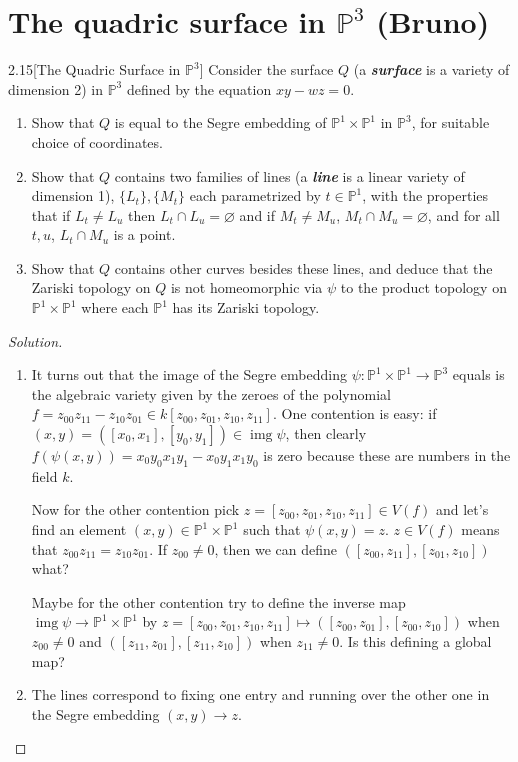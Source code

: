 \section{The quadric surface in $\mathbb{P}^3$ (Bruno)}

\begin{manualexercise}{2.15}[The Quadric Surface in $\mathbb{P}^3$]
	Consider the surface $Q$ (a \textbf{\textit{surface}} is a variety of dimension 2) in $\mathbb{P}^3$ defined by the equation $xy-wz=0$.
	\begin{enumerate}
		\item Show that $Q$ is equal to the Segre embedding of $\mathbb{P}^1\times\mathbb{P}^1$ in $\mathbb{P}^3$, for suitable choice of coordinates.
		\item Show that $Q$ contains two families of lines (a \textbf{\textit{line}} is a linear variety of dimension 1), $\{L_t\},\{M_t\}$ each parametrized by $t\in\mathbb{P}^1$, with the properties that if $L_t\neq L_u$ then $L_t\cap L_u=\varnothing$ and if $M_t\neq M_u$, $M_t\cap M_u=\varnothing$, and for all $t,u$, $L_t\cap M_u$ is a point.
		\item Show that $Q$ contains other curves besides these lines, and deduce that the Zariski topology on $Q$ is not homeomorphic via $\psi$ to the product topology on $\mathbb{P}^1\times \mathbb{P}^1$ where each $\mathbb{P}^1$ has its Zariski topology.
	\end{enumerate}
\end{manualexercise}

\begin{proof}[Solution]\leavevmode
	\begin{enumerate}
		\item It turns out that the image of the Segre embedding $\psi:\mathbb{P}^1\times\mathbb{P}^1\to\mathbb{P}^3$ equals is the algebraic variety given by the zeroes of the polynomial $f=z_{00}z_{11}-z_{10}z_{01}\in k[z_{00},z_{01},z_{10},z_{11}]$. One contention is easy: if $(x,y)=([x_0,x_1],[y_0,y_1])\in\operatorname{img}\psi$, then clearly $f(\psi(x,y))=x_0y_0x_1y_1-x_0y_1x_1y_0$ is zero because these are numbers in the field $k$.
		
		Now for the other contention pick $z=[z_{00},z_{01},z_{10},z_{11}]\in V(f)$ and let's find an element $(x,y)\in\mathbb{P}^1\times\mathbb{P}^1$ such that $\psi(x,y)=z$. $z\in V(f)$ means that $z_{00}z_{11}=z_{10}z_{01}$. If $z_{00}\neq0$, then we can define $([z_{00},z_{11}],[z_{01},z_{10}])$ {\color{magenta}what?}
		
		Maybe for the other contention try to define the inverse map $\operatorname{img}\psi\to\mathbb{P}^1\times\mathbb{P}^1$ by $z=[z_{00},z_{01},z_{10},z_{11}]\mapsto([z_{00},z_{01}],[z_{00},z_{10}])$ when $z_{00}\neq0$ and $([z_{11},z_{01}],[z_{11},z_{10}])$ when $z_{11}\neq0$. Is this defining a global map?
		
		\item The lines correspond to fixing one entry and running over the other one in the Segre embedding $(x,y)\to z$. 
	\end{enumerate}
\end{proof}


